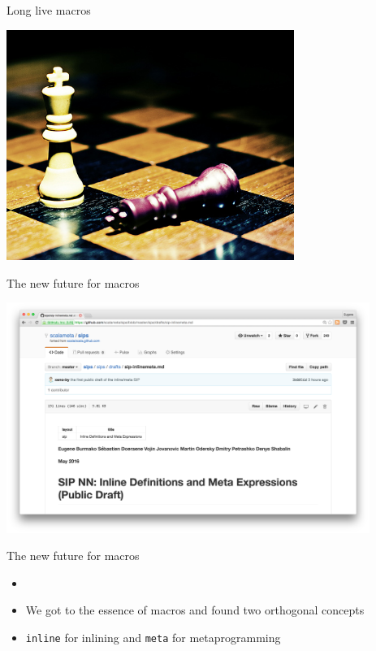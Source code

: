 \documentclass[svgnames,dvipsnames,hyperref={bookmarks=false},usepdftitle=false]{beamer}
\begin{document}
\begin{frame}{Long live macros}
\vskip20pt
\begin{center}
\includegraphics[height=7.5cm]{long-live-macros.jpg}
\end{center}
\end{frame}

\begin{frame}{The new future for macros}
\vskip20pt
\begin{center}
\includegraphics[height=7.5cm]{inlinemeta-sip.png}
\end{center}
\end{frame}

\begin{frame}{The new future for macros}
\begin{itemize}
\item {}
\item We got to the essence of macros and found two orthogonal concepts
\item \texttt{inline} for inlining and \texttt{meta} for metaprogramming
\end{itemize}
\end{frame}
\end{document}
